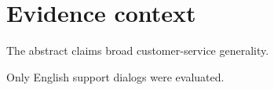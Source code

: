 \section{Evidence context}
The abstract claims broad customer-service generality.

Only English support dialogs were evaluated.
